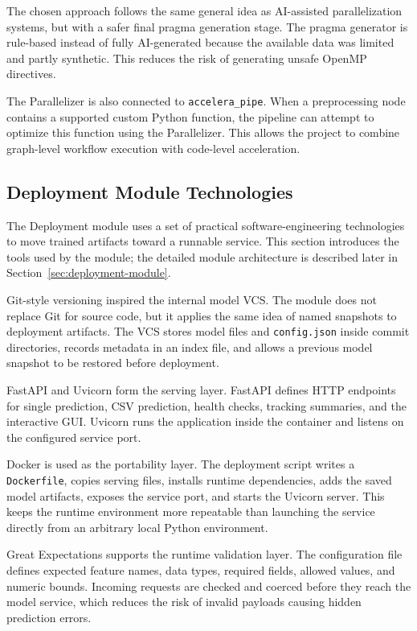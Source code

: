 \documentclass[12pt,a4paper]{report}
\begin{document}
\noindent The chosen approach follows the same general idea as AI-assisted
parallelization systems, but with a safer final pragma generation stage. The
pragma generator is rule-based instead of fully AI-generated because the
available data was limited and partly synthetic. This reduces the risk of
generating unsafe OpenMP directives.

\noindent The Parallelizer is also connected to \texttt{accelera\_pipe}. When a
preprocessing node contains a supported custom Python function, the pipeline can
attempt to optimize this function using the Parallelizer. This allows the
project to combine graph-level workflow execution with code-level acceleration.

\subsection{Deployment Module Technologies}
The Deployment module uses a set of practical software-engineering technologies
to move trained artifacts toward a runnable service. This section introduces the
tools used by the module; the detailed module architecture is described later
in Section~\ref{sec:deployment-module}.

Git-style versioning inspired the internal model VCS. The module does not
replace Git for source code, but it applies the same idea of named snapshots to
deployment artifacts. The VCS stores model files and \texttt{config.json}
inside commit directories, records metadata in an index file, and allows a
previous model snapshot to be restored before deployment.

FastAPI and Uvicorn form the serving layer. FastAPI defines HTTP endpoints for
single prediction, CSV prediction, health checks, tracking summaries, and the
interactive GUI. Uvicorn runs the application inside the container and listens
on the configured service port.

Docker is used as the portability layer. The deployment script writes a
\texttt{Dockerfile}, copies serving files, installs runtime dependencies, adds
the saved model artifacts, exposes the service port, and starts the Uvicorn
server. This keeps the runtime environment more repeatable than launching the
service directly from an arbitrary local Python environment.

Great Expectations supports the runtime validation layer. The configuration
file defines expected feature names, data types, required fields, allowed
values, and numeric bounds. Incoming requests are checked and coerced before
they reach the model service, which reduces the risk of invalid payloads
causing hidden prediction errors.
\end{document}
